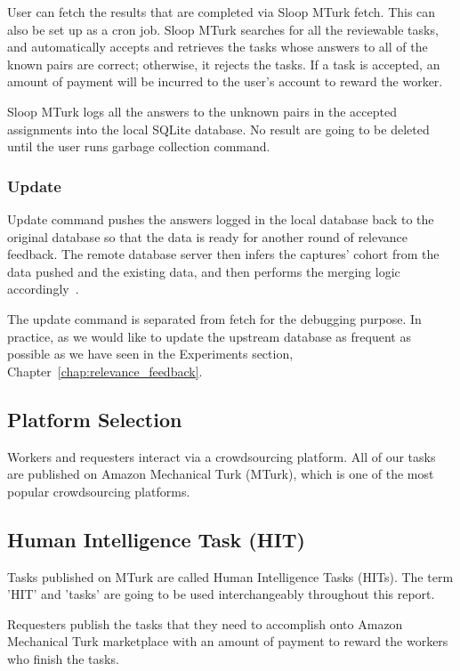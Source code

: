 User can fetch the results that are completed via Sloop MTurk fetch. This can
also be set up as a cron job. Sloop MTurk searches for all the reviewable
tasks, and automatically accepts and retrieves the tasks whose answers to all
of the known pairs are correct; otherwise, it rejects the tasks. If a task is
accepted, an amount of payment will be incurred to the user's account to reward
the worker.

Sloop MTurk logs all the answers to the unknown pairs in the accepted
assignments into the local SQLite database. No result are going to be deleted
until the user runs garbage collection command.

\subsubsection{Update}

Update command pushes the answers logged in the local database back to the
original database so that the data is ready for another round of relevance
feedback. The remote database server then infers the captures' cohort from the
data pushed and the existing data, and then performs the merging logic
accordingly~\cite{sloopdocs}.

The update command is separated from fetch for the debugging purpose. In
practice, as we would like to update the upstream database as frequent as
possible as we have seen in the Experiments section,
Chapter~\ref{chap:relevance_feedback}.

\subsection{Platform Selection}

Workers and requesters interact via a crowdsourcing platform. All of our tasks
are published on Amazon Mechanical Turk (MTurk), which is one of the most
popular crowdsourcing platforms.

\subsection{Human Intelligence Task (HIT)}

Tasks published on MTurk are called Human
Intelligence Tasks (HITs). The term 'HIT' and 'tasks' are going to be used
interchangeably throughout this report.

Requesters publish the tasks that they need to accomplish onto Amazon
Mechanical Turk marketplace with an amount of payment to reward the workers who
finish the tasks.

